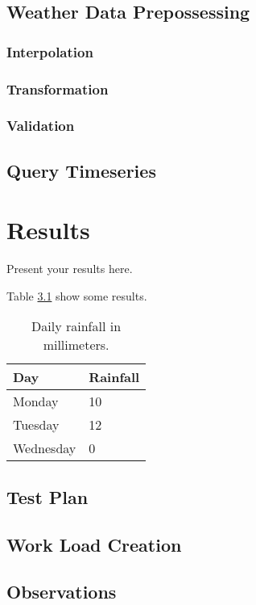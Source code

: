 \documentclass[a4paper,oneside,12pt]{report}
\begin{document}
\section{Weather Data Prepossessing}

\subsection{Interpolation}

\subsection{Transformation}

\subsection{Validation}

\section{Query Timeseries}

\chapter{Results}
\label{ch:results}

Present your results here. 

Table \ref{ta:results} show some results.
\begin{table}
  \centering
  \begin{tabular}{|l|l|}
    \hline
    Day & Rainfall \\
    \hline
    Monday & 10\\
    Tuesday & 12\\
    Wednesday & 0\\
    \hline
  \end{tabular}
  \caption{Daily rainfall in millimeters.}\label{ta:results}
\end{table}

\section{Test Plan}

\section{Work Load Creation}

\section{Observations}
\end{document}

